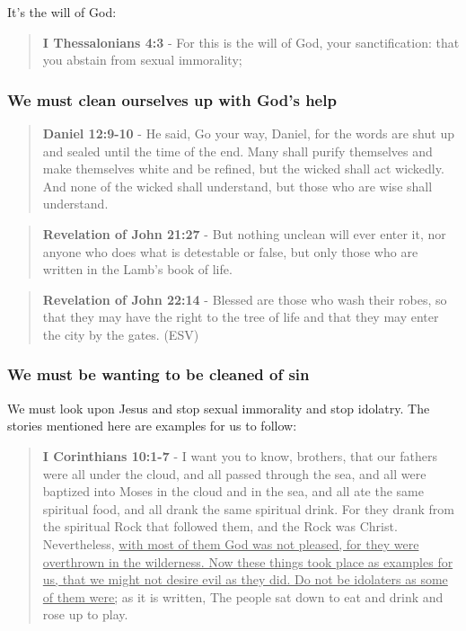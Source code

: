 \documentclass[11pt]{article}
\begin{document}
It's the will of God:

\begin{quote}
\textbf{I Thessalonians 4:3} - For this is the will of God, your sanctification: that you abstain from sexual immorality;
\end{quote}

\subsubsection{We \textbf{must} clean ourselves up with God's help}
\label{sec:org24923c4}
\begin{quote}
\textbf{Daniel 12:9-10} - He said, Go your way, Daniel, for the words are shut up and sealed until the time of the end.  Many shall purify themselves and make themselves white and be refined, but the wicked shall act wickedly. And none of the wicked shall understand, but those who are wise shall understand.
\end{quote}

\begin{quote}
\textbf{Revelation of John 21:27} - But nothing unclean will ever enter it, nor anyone who does what is detestable or false, but only those who are written in the Lamb's book of life.
\end{quote}

\begin{quote}
\textbf{Revelation of John 22:14} - Blessed are those who wash their robes, so that they may have the right to the tree of life and that they may enter the city by the gates. (ESV)
\end{quote}

\subsubsection{We must be wanting to be cleaned of sin}
\label{sec:org17228b0}
We must look upon Jesus and stop sexual immorality and stop idolatry. The stories mentioned here are examples for us to follow:

\begin{quote}
\textbf{I Corinthians 10:1-7} - I want you to know, brothers, that our fathers were all under the cloud, and all passed through the sea, and all were baptized into Moses in the cloud and in the sea, and all ate the same spiritual food, and all drank the same spiritual drink. For they drank from the spiritual Rock that followed them, and the Rock was Christ. Nevertheless, \uline{with most of them God was not pleased, for they were overthrown in the wilderness. Now these things took place as examples for us, that we might not desire evil as they did. Do not be idolaters as some of them were;} as it is written, The people sat down to eat and drink and rose up to play.
\end{quote}
\end{document}
